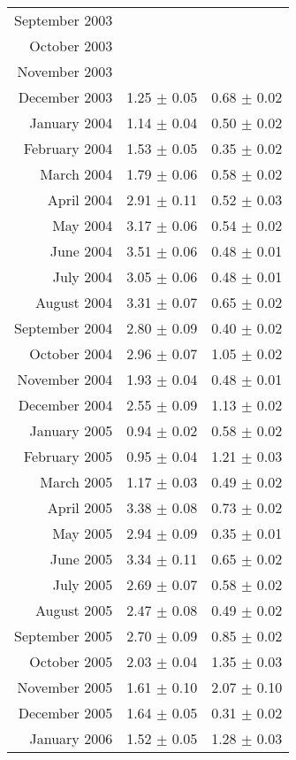 \documentclass[a4paper,12pt]{article}
\begin{document}
\begin{center}
\begin{longtable}{|r|c|c|}
    September	2003	&				&				\\
    October	2003	&				&				\\
    November	2003	&				&				\\
    December	2003	&	1.25	$\pm$	0.05	&	0.68	$\pm$	0.02	\\
    January	2004	&	1.14	$\pm$	0.04	&	0.50	$\pm$	0.02	\\
    February	2004	&	1.53	$\pm$	0.05	&	0.35	$\pm$	0.02	\\
    March	2004	&	1.79	$\pm$	0.06	&	0.58	$\pm$	0.02	\\
    April	2004	&	2.91	$\pm$	0.11	&	0.52	$\pm$	0.03	\\
    May		2004	&	3.17	$\pm$	0.06	&	0.54	$\pm$	0.02	\\
    June	2004	&	3.51	$\pm$	0.06	&	0.48	$\pm$	0.01	\\
    July	2004	&	3.05	$\pm$	0.06	&	0.48	$\pm$	0.01	\\
    August	2004	&	3.31	$\pm$	0.07	&	0.65	$\pm$	0.02	\\
    September	2004	&	2.80	$\pm$	0.09	&	0.40	$\pm$	0.02	\\
    October	2004	&	2.96	$\pm$	0.07	&	1.05	$\pm$	0.02	\\
    November	2004	&	1.93	$\pm$	0.04	&	0.48	$\pm$	0.01	\\
    December	2004	&	2.55	$\pm$	0.09	&	1.13	$\pm$	0.02	\\
    January	2005	&	0.94	$\pm$	0.02	&	0.58	$\pm$	0.02	\\
    February	2005	&	0.95	$\pm$	0.04	&	1.21	$\pm$	0.03	\\
    March	2005	&	1.17	$\pm$	0.03	&	0.49	$\pm$	0.02	\\
    April	2005	&	3.38	$\pm$	0.08	&	0.73	$\pm$	0.02	\\
    May		2005	&	2.94	$\pm$	0.09	&	0.35	$\pm$	0.01	\\
    June	2005	&	3.34	$\pm$	0.11	&	0.65	$\pm$	0.02	\\
    July	2005	&	2.69	$\pm$	0.07	&	0.58	$\pm$	0.02	\\
    August	2005	&	2.47	$\pm$	0.08	&	0.49	$\pm$	0.02	\\
    September	2005	&	2.70	$\pm$	0.09	&	0.85	$\pm$	0.02	\\
    October	2005	&	2.03	$\pm$	0.04	&	1.35	$\pm$	0.03	\\
    November	2005	&	1.61	$\pm$	0.10	&	2.07	$\pm$	0.10	\\
    December	2005	&	1.64	$\pm$	0.05	&	0.31	$\pm$	0.02	\\
    January	2006	&	1.52	$\pm$	0.05	&	1.28	$\pm$	0.03	\\

\end{longtable}
\end{center}
\end{document}

